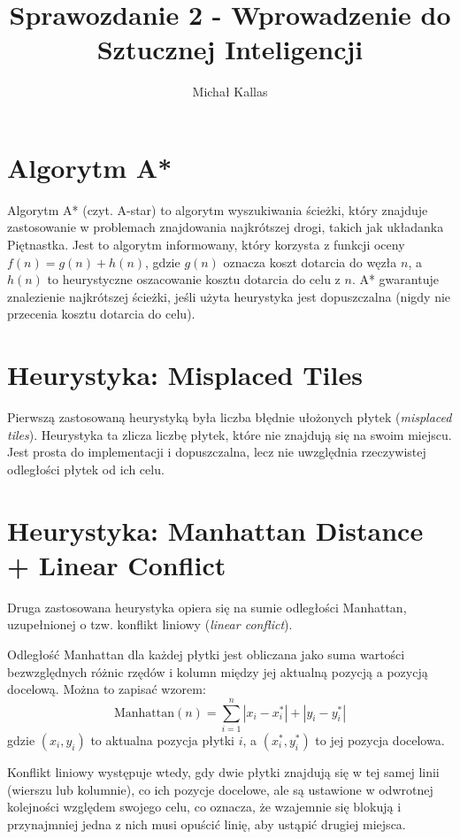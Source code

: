 \documentclass{article}
\title{Sprawozdanie 2 - Wprowadzenie do Sztucznej Inteligencji}
\author{Michał Kallas}
\begin{document}
\maketitle

\section{Algorytm A*}
Algorytm A* (czyt. A-star) to algorytm wyszukiwania ścieżki, który znajduje zastosowanie w problemach znajdowania najkrótszej drogi, takich jak układanka Piętnastka. Jest to algorytm informowany, który korzysta z funkcji oceny \(f(n) = g(n) + h(n)\), gdzie \(g(n)\) oznacza koszt dotarcia do węzła \(n\), a \(h(n)\) to heurystyczne oszacowanie kosztu dotarcia do celu z \(n\). A* gwarantuje znalezienie najkrótszej ścieżki, jeśli użyta heurystyka jest dopuszczalna (nigdy nie przecenia kosztu dotarcia do celu).

\section{Heurystyka: Misplaced Tiles}
Pierwszą zastosowaną heurystyką była liczba błędnie ułożonych płytek (\textit{misplaced tiles}). Heurystyka ta zlicza liczbę płytek, które nie znajdują się na swoim miejscu. Jest prosta do implementacji i dopuszczalna, lecz nie uwzględnia rzeczywistej odległości płytek od ich celu.

\section{Heurystyka: Manhattan Distance + Linear Conflict}
Druga zastosowana heurystyka opiera się na sumie odległości Manhattan, uzupełnionej o tzw. konflikt liniowy (\textit{linear conflict}).

Odległość Manhattan dla każdej płytki jest obliczana jako suma wartości bezwzględnych różnic rzędów i kolumn między jej aktualną pozycją a pozycją docelową. Można to zapisać wzorem:
\[
\text{Manhattan}(n) = \sum_{i=1}^{n} \left| x_i - x_i^* \right| + \left| y_i - y_i^* \right|
\]
gdzie \((x_i, y_i)\) to aktualna pozycja płytki \(i\), a \((x_i^*, y_i^*)\) to jej pozycja docelowa.

Konflikt liniowy występuje wtedy, gdy dwie płytki znajdują się w tej samej linii (wierszu lub kolumnie), co ich pozycje docelowe, ale są ustawione w odwrotnej kolejności względem swojego celu, co oznacza, że wzajemnie się blokują i przynajmniej jedna z nich musi opuścić linię, aby ustąpić drugiej miejsca.
\end{document}
